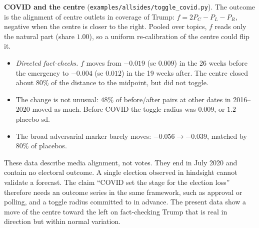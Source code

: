 \documentclass[11pt]{article}
\theoremstyle{definition}
\theoremstyle{remark}
\begin{document}
\textbf{COVID and the centre} (\texttt{examples/allsides/toggle\_covid.py}). The outcome is the alignment of centre outlets in coverage of Trump: $f=2P_C-P_L-P_R$, negative when the centre is closer to the right. Pooled over topics, $f$ reads only the natural part (share $1.00$), so a uniform re-calibration of the centre could flip it.
\begin{itemize}
  \item \emph{Directed fact-checks.} $f$ moves from $-0.019$ (se $0.009$) in the 26 weeks before the emergency to $-0.004$ (se $0.012$) in the 19 weeks after. The centre closed about $80\%$ of the distance to the midpoint, but did not toggle.
  \item The change is not unusual: $48\%$ of before/after pairs at other dates in 2016--2020 moved as much. Before COVID the toggle radius was $0.009$, or $1.2$ placebo sd.
  \item The broad adversarial marker barely moves: $-0.056\to-0.039$, matched by $80\%$ of placebos.
\end{itemize}
These data describe media alignment, not votes. They end in July 2020 and contain no electoral outcome. A single election observed in hindsight cannot validate a forecast. The claim ``COVID set the stage for the election loss'' therefore needs an outcome series in the same framework, such as approval or polling, and a toggle radius committed to in advance. The present data show a move of the centre toward the left on fact-checking Trump that is real in direction but within normal variation.
\end{document}
